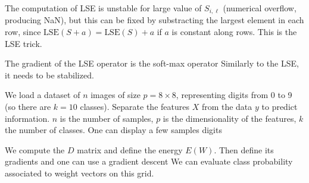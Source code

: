 The computation of LSE is
unstable for large value of $S_{i,\ell}$ (numerical overflow, producing NaN), but this can be
fixed by substracting the largest element in each row,
since $ \text{LSE}(S+a)=\text{LSE}(S)+a $ if $a$ is constant along rows. This is
the LSE trick.


The gradient of the LSE operator is the soft-max operator
Similarly to the LSE, it needs to be stabilized.


We load a dataset of $n$ images of size $p = 8 \times 8$, representing digits from 0
to 9 (so there are $k=10$ classes).
%
Separate the features $X$ from the data $y$ to predict information.
%
$n$ is the number of samples, $p$ is the dimensionality of the features, $k$
the number of classes.
%
One can display a few samples digits



We compute the $D$ matrix and define the energy $E(W)$.
%
Then define its gradients
and one can use a gradient descent
We can evaluate class probability associated to weight vectors on this grid.


